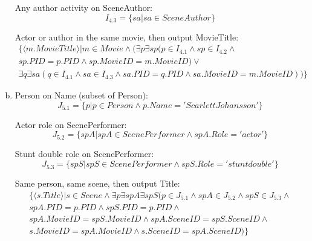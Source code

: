 \documentclass{article}
\begin{document}
\begin{enumerate}[(a)]
Any author activity on SceneAuthor:
\begin{equation}
I_{4.3} = \{ sa | sa \in SceneAuthor \}
\end{equation}

Actor or author in the same movie, then output MovieTitle:
\begin{multline}
\{ \langle m.MovieTitle \rangle | m \in Movie \land (\exists p\exists sp(p \in I_{4.1} \land sp \in I_{4.2} \land \\
 sp.PID=p.PID \land sp.MovieID=m.MovieID) \lor {}\\
\exists q\exists sa(q \in I_{4.1} \land sa \in I_{4.3} \land sa.PID=q.PID \land sa.MovieID=m.MovieID)
) \}
\end{multline}

\item
Person on Name (subset of Person):
\begin{equation}
J_{5.1} = \{ p | p \in Person \land p.Name='Scarlett Johansson' \}
\end{equation}

Actor role on ScenePerformer:
\begin{equation}
J_{5.2} = \{ spA | spA \in ScenePerformer \land spA.Role='actor' \}
\end{equation}

Stunt double role on ScenePerformer:
\begin{equation}
J_{5.3} = \{ spS | spS \in ScenePerformer \land spS.Role='stunt double' \}
\end{equation}

Same person, same scene, then output Title:
\begin{multline}
\{ \langle s.Title \rangle | s \in Scene \land \exists p\exists spA\exists spS(p \in J_{5.1} \land spA \in J_{5.2} \land spS \in J_{5.3} \land {}\\
 spA.PID=p.PID \land spS.PID=p.PID \land \\
 spA.MovieID=spS.MovieID \land spA.SceneID=spS.SceneID \land\\
 s.MovieID=spA.MovieID \land s.SceneID=spA.SceneID ) \}
\end{multline}


\end{enumerate}
\end{document}
